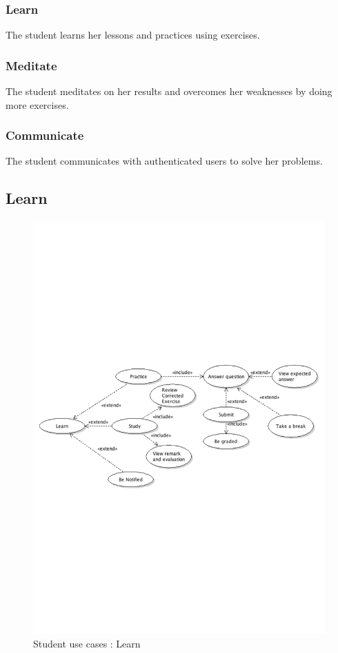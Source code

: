 		\subsubsection{Learn}
			The student learns her lessons and practices using exercises.
		\subsubsection{Meditate}
			The student meditates on her results and overcomes her weaknesses by doing more exercises.
		\subsubsection{Communicate}
			The student communicates with authenticated users to solve her problems.
\newpage
	\subsection{Learn}
		\begin{figure}[ht]
			\begin{center}
				\includegraphics[width=\textwidth,  trim=2cm 10cm 2cm 8cm]{UML_figure/use_cases/student/UC_Student_Learn.pdf}
				\caption{Student use cases : Learn}
			\end{center}
		\end{figure}
